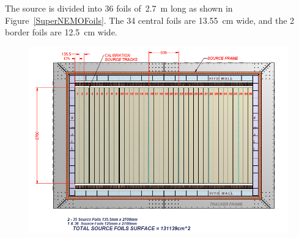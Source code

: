 \documentclass[main.tex]{subfiles}
\begin{document}
\bigskip


\NI The source is divided into 36 foils of~2.7~m long as shown in Figure~\ref{SuperNEMOFoils}. The 34 central foils are 13.55~cm wide, and the 2 border foils are 12.5~cm wide.


\begin{figure}[h!]
\begin{center}
\includegraphics[scale=0.33]{pictures/Chap3/foil.png}

\end{center}
\end{figure}
\end{document}
